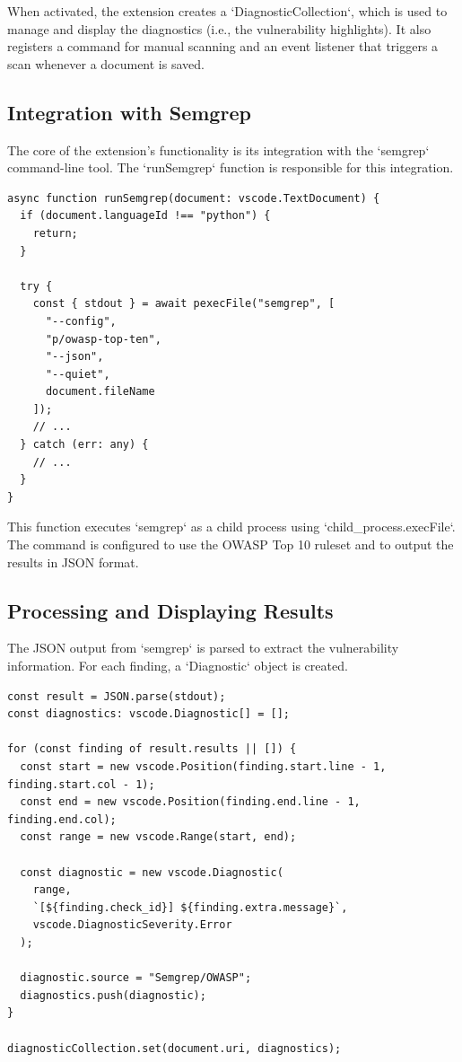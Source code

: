 When activated, the extension creates a `DiagnosticCollection`, which is used to manage and display the diagnostics (i.e., the vulnerability highlights). It also registers a command for manual scanning and an event listener that triggers a scan whenever a document is saved.

\subsection{Integration with Semgrep}

The core of the extension's functionality is its integration with the `semgrep` command-line tool. The `runSemgrep` function is responsible for this integration.

\begin{verbatim}
async function runSemgrep(document: vscode.TextDocument) {
  if (document.languageId !== "python") {
    return;
  }

  try {
    const { stdout } = await pexecFile("semgrep", [
      "--config",
      "p/owasp-top-ten",
      "--json",
      "--quiet",
      document.fileName
    ]);
    // ...
  } catch (err: any) {
    // ...
  }
}
\end{verbatim}

This function executes `semgrep` as a child process using `child\_process.execFile`. The command is configured to use the OWASP Top 10 ruleset and to output the results in JSON format.

\subsection{Processing and Displaying Results}

The JSON output from `semgrep` is parsed to extract the vulnerability information. For each finding, a `Diagnostic` object is created.

\begin{verbatim}
const result = JSON.parse(stdout);
const diagnostics: vscode.Diagnostic[] = [];

for (const finding of result.results || []) {
  const start = new vscode.Position(finding.start.line - 1, finding.start.col - 1);
  const end = new vscode.Position(finding.end.line - 1, finding.end.col);
  const range = new vscode.Range(start, end);

  const diagnostic = new vscode.Diagnostic(
    range,
    `[${finding.check_id}] ${finding.extra.message}`,
    vscode.DiagnosticSeverity.Error
  );

  diagnostic.source = "Semgrep/OWASP";
  diagnostics.push(diagnostic);
}

diagnosticCollection.set(document.uri, diagnostics);
\end{verbatim}

